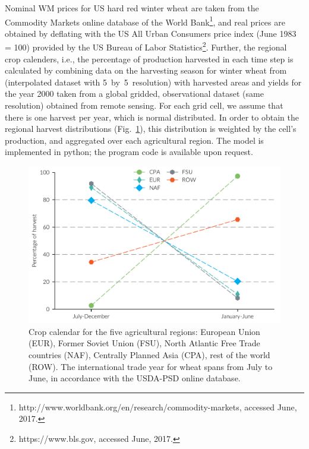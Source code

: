   Nominal WM prices for US hard red winter wheat are taken from the Commodity Markets online
  database of the World Bank\footnote{http://www.worldbank.org/en/research/commodity-markets,
    accessed June, 2017.}, and real prices are obtained by deflating with the US All Urban Consumers
  price index (June 1983 = 100) provided by the US Bureau of Labor
  Statistics\footnote{https://www.bls.gov, accessed June, 2017.}. Further, the regional crop
  calenders, i.e., the percentage of production harvested in each time step is calculated by
  combining data on the harvesting season for winter wheat from \cite{SAC10} (interpolated dataset
  with 5\minute~by~5\minute~resolution) with harvested areas and yields for the year 2000
  taken from a global gridded, observational dataset \cite{MON08} (same resolution) obtained from
  remote sensing. For each grid cell, we assume that there is one harvest per year, which is normal
  distributed. In order to obtain the regional harvest distributions (Fig.~\ref{fig:crop_cal}), this
  distribution is weighted by the cell's production, and aggregated over each agricultural
  region. The model is implemented in python; the program code is available upon request.
\begin{figure}[htbp]
  \centering
\includegraphics[width=.8\textwidth]{plots/crop_calendar/crop_cal_gridded}
\caption{Crop calendar for the five agricultural regions: European Union (EUR), Former Soviet Union (FSU), North Atlantic Free Trade countries (NAF), Centrally Planned Asia (CPA), rest of the world (ROW). The international trade year for wheat spans from July to June, in accordance with the USDA-PSD online database.}
  \label{fig:crop_cal}
\end{figure}

